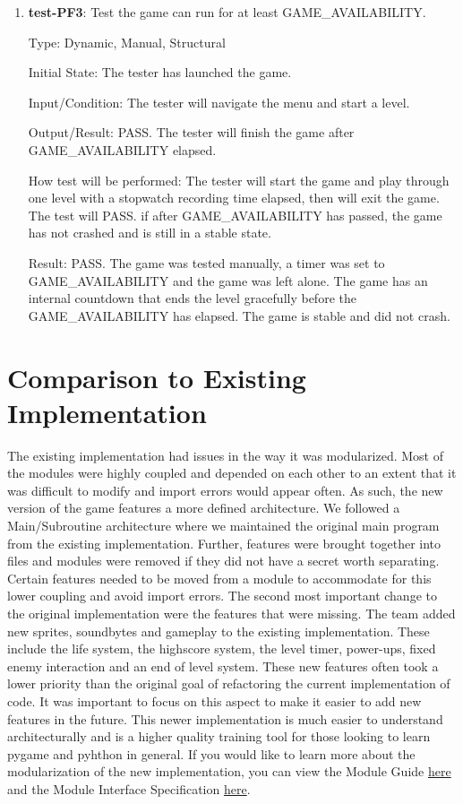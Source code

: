 \documentclass[12pt, titlepage]{article}
\begin{document}
\begin{enumerate}
\item{\textbf{test-PF3}: Test the game can run for at least GAME\_AVAILABILITY.\\}

Type: Dynamic, Manual, Structural
					
Initial State: The tester has launched the game.
					
Input/Condition: The tester will navigate the menu and start a level.
					
Output/Result: PASS. The tester will finish the game after GAME\_AVAILABILITY elapsed.
					
How test will be performed: The tester will start the game and play through one level with a stopwatch recording time elapsed, then will exit the game. The test will PASS. if after GAME\_AVAILABILITY has passed, the game has not crashed and is still in a stable state.

Result: PASS. The game was tested manually, a timer was set to GAME\_AVAILABILITY and the game was left alone. The game has an internal countdown that ends the level gracefully before the GAME\_AVAILABILITY has elapsed. The game is stable and did not crash.

\end{enumerate}

\section{Comparison to Existing Implementation}	

The existing implementation had issues in the way it was modularized. Most of the modules were highly coupled and depended on each other to an extent that it was difficult to modify and import errors would appear often. As such, the new version of the game features a more defined architecture. We followed a Main/Subroutine architecture where we maintained the original main program from the existing implementation. Further, features were brought together into files and modules were removed if they did not have a secret worth separating. Certain features needed to be moved from a module to accommodate for this lower coupling and avoid import errors. The second most important change to the original implementation were the features that were missing. The team added new sprites, soundbytes and gameplay to the existing implementation. These include the life system, the highscore system, the level timer, power-ups, fixed enemy interaction and an end of level system. These new features often took a lower priority than the original goal of refactoring the current implementation of code. It was important to focus on this aspect to make it easier to add new features in the future. This newer implementation is much easier to understand architecturally and is a higher quality training tool for those looking to learn pygame and pyhthon in general. If you would like to learn more about the modularization of the new implementation, you can view the Module Guide \href{https://gitlab.cas.mcmaster.ca/jandricd/super-refactored-mario-bros/-/blob/master/Doc/Design/MG/MG.pdf}{here} and the Module Interface Specification \href{https://gitlab.cas.mcmaster.ca/jandricd/super-refactored-mario-bros/-/blob/master/Doc/Design/MIS/MIS.pdf}{here}.
\end{document}
